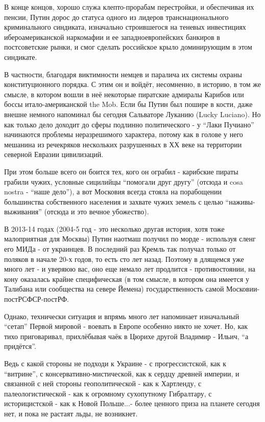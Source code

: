 В конце концов, хорошо служа клепто-прорабам перестройки, и обеспечивая их
пенсии, Путин дорос до статуса одного из лидеров транснационального
криминального синдиката, изначально строившегося на теневых инвестициях
ибероамериканской наркомафии и ее западноевропейских банкиров в постсоветские
рынки, и смог сделать российское крыло доминирующим в этом синдикате. 

В частности, благодаря виктимности немцев и паралича их системы охраны
конституционного порядка. С этим он и войдёт, несомненно, в историю, в том же
смысле, в котором вошли в неё некоторые пиратские адмиралы Карибов или боссы
итало-американской the Mob. Если бы Путин был пошире в кости, даже внешне
немного напоминал бы сегодня Сальваторе Луканию (Lucky Luciano).  Но как только
дело доходит до сферы подлинно политического - у \enquote{Лаки Пучиано} начинаются
проблемы неразрешимого характера, потому как в голове у него мешанина из
речекряков нескольких разрушенных в ХХ веке на территории северной Евразии
цивилизаций. 

При этом больше всего он боится тех, кого он ограбил - карибские пираты грабили
чужих, условные сицилийцы \enquote{помогали друг другу} (отсюда и cosa nostra - \enquote{наше
дело}), а вот Московия всегда стояла на порабощении большинства собственного
населения и захвате чужих земель с целью \enquote{наживы-выживания} (отсюда и это
вечное убожество).  

В 2013-14 годах (2004-5 год - это несколько другая история, хотя тоже
малоприятная для Москвы) Путин наотмаш получил по морде - используя сленг его
МИДа - от украинцев. В последний раз Кремль так получал только от поляков в
начале 20-х годов, то есть сто лет назад. Поэтому в длящемся уже много лет - и
уверяюю вас, оно еще немало лет продлится - противостоянии, на кону оказалась
крайне специфическая (в том смысле, в котором она имеется у Талибана или
сообщества на севере Йемена) государственность самой Московии-постРСФСР-постРФ. 

Однако, технически ситуация и впрямь много лет напоминает изначальный
\enquote{сетап} Первой мировой - воевать в Европе особенно никто не хочет. Но,
как тихо приговаривал, прихлёбывая чаёк в Цюрихе другой Владимир - Ильич,
\enquote{а придётся}.  

Ведь с какой стороны не подходи к Украине - с прогрессистской, как к
\enquote{витрине}, с консервативно-мистической, как к сердцу древней империи, и
связанной с ней стороны геополитической - как к Хартленду, с палеологистической
- как к огромному сухопутному Гибралтару, с историцистской - как к Новой
Польше...- более ценного приза на планете сегодня нет, и пока не растаят льды,
не возникнет. 

